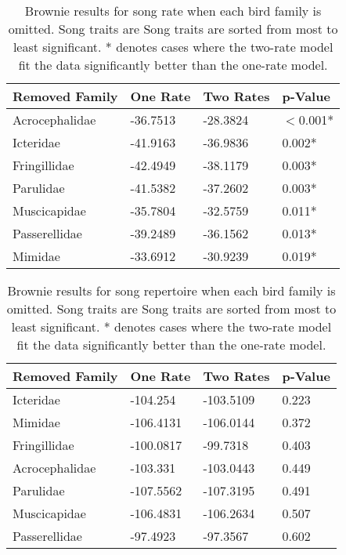 \documentclass[a4paper,12pt]{article}
\begin{document}
\begin{table}[ht]
\caption{Brownie results for song rate when each bird family is omitted. Song traits are Song traits are sorted from most to least significant. * denotes cases where the two-rate model fit the data significantly better than the one-rate model.}
\centering
\begin{tabular}{llll}
  \hline
Removed Family & One Rate & Two Rates & p-Value \\ 
  \hline
Acrocephalidae & -36.7513 & -28.3824 & $<$0.001* \\ 
  Icteridae & -41.9163 & -36.9836 & 0.002* \\ 
  Fringillidae & -42.4949 & -38.1179 & 0.003* \\ 
  Parulidae & -41.5382 & -37.2602 & 0.003* \\ 
  Muscicapidae & -35.7804 & -32.5759 & 0.011* \\ 
  Passerellidae & -39.2489 & -36.1562 & 0.013* \\ 
  Mimidae & -33.6912 & -30.9239 & 0.019* \\ 
   \hline
\end{tabular}
\end{table}

\begin{table}[ht]
\caption{Brownie results for song repertoire when each bird family is omitted. Song traits are Song traits are sorted from most to least significant. * denotes cases where the two-rate model fit the data significantly better than the one-rate model.}
\centering
\begin{tabular}{llll}
  \hline
Removed Family & One Rate & Two Rates & p-Value \\ 
  \hline
Icteridae & -104.254 & -103.5109 & 0.223 \\ 
  Mimidae & -106.4131 & -106.0144 & 0.372 \\ 
  Fringillidae & -100.0817 & -99.7318 & 0.403 \\ 
  Acrocephalidae & -103.331 & -103.0443 & 0.449 \\ 
  Parulidae & -107.5562 & -107.3195 & 0.491 \\ 
  Muscicapidae & -106.4831 & -106.2634 & 0.507 \\ 
  Passerellidae & -97.4923 & -97.3567 & 0.602 \\ 
   \hline
\end{tabular}
\end{table}
\end{document}
